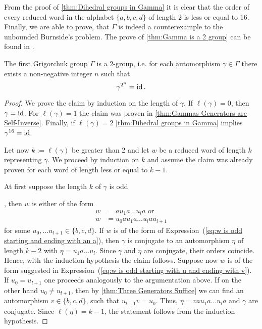 From the proof of \cref{thm:Dihedral groups in Gamma} it is clear that the order of every reduced word in the alphabet $\lbrace a,b,c,d \rbrace$ of length 2 is less or equal to 16. Finally, we are able to prove, that $\Gamma$ is indeed a counterexample to the unbounded Burnside's problem. The prove of \cref{thm:Gamma is a 2 group} can be found in \cite{de2000topics}.
\begin{thm}\label{thm:Gamma is a 2 group}
The first Grigorchuk group $\Gamma$ is a 2-group, i.e. for each automorphism $\gamma\in\Gamma$ there exists a non-negative integer $n$ such that
\begin{equation*}
\gamma^{2^n}=\operatorname{id}.
\end{equation*}
\end{thm}
\begin{proof}
We prove the claim by induction on the length of $\gamma$. \hypertarget{thm:Base Case}{If} $\ell(\gamma)=0$, then $\gamma=\operatorname{id}$. For $\ell(\gamma)=1$ the claim was proven in \cref{thm:Gammas Generators are Self-Inverse}. Finally, if $\ell(\gamma)=2$ \cref{thm:Dihedral groups in Gamma} implies $\gamma^{16}=\operatorname{id}$.

Let now $k:=\ell(\gamma)$ be greater than 2 and let $w$ be a reduced word of length $k$ representing $\gamma$. We proceed by induction on $k$ and assume the claim was already proven for each word of length less or equal to $k-1$.

\hypertarget{thm:k is odd}{At first suppose the length $k$ of $\gamma$ is odd}, then $w$ is either of the form
\begin{align}
w&=au_1a\ldots u_la\text{ or}\label{eq:w is odd starting and ending with an a}\\
w&=u_0au_1a\ldots u_lau_{l+1}\label{eq:w is odd starting with u and ending with v}
\end{align}
for some $u_0,\ldots u_{l+1}\in\lbrace b,c,d\rbrace$. If $w$ is of the form of Expression~(\ref{eq:w is odd starting and ending with an a}), then $\gamma$ is conjugate to an automorphism $\eta$ of length $k-2$ with $\eta=u_1a\ldots u_l$. Since $\gamma$ and $\eta$ are conjugate, their orders coincide. Hence, with the induction hypothesis the claim follows. Suppose now $w$ is of the form suggested in Expression~(\ref{eq:w is odd starting with u and ending with v}). If $u_0=u_{l+1}$ one proceeds analogously to the argumentation above. If on the other hand $u_0\not=u_{l+1}$, then by \cref{thm:Three Generators Suffice} we can find an automorphism $v\in\lbrace b,c,d\rbrace$, such that $u_{l+1}v=u_0$. Thus, $\eta=vau_1a\ldots u_la$ and $\gamma$ are conjugate. Since $\ell(\eta)=k-1$, the statement follows from the induction hypothesis.


\end{proof}
